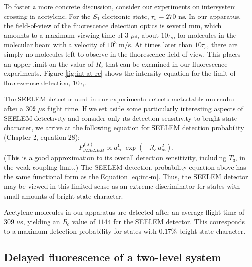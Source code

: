 \documentclass[12pt]{mitthesis}
\begin{document}
To foster a more concrete discussion, consider our experiments on
intersystem crossing in acetylene.  For the $S_1$ electronic state,
$\tau_s=270$ ns.  In our apparatus, the field-of-view of the
fluorescence detection optics is several mm, which amounts to a
maximum viewing time of 3 $\mu$s, about $10\tau_s$, for molecules in
the molecular beam with a velocity of $10^3$ m/s.  At times later than
$10\tau_s$, there are simply no molecules left to observe in the
fluorescence field of view.  This places an upper limit on the value
of $R_c$ that can be examined in our fluorescence experiments.  Figure
\ref{fig:int-at-rc} shows the intensity equation for the limit of
fluorescence detection, $10\tau_s$.

The SEELEM detector used in our experiments detects metastable
molecules after a 309 $\mu$s flight time.  If we set aside some
particularly interesting aspects of SEELEM detectivity and consider
only its detection sensitivity to bright state character, we arrive at
the following equation for SEELEM detection probability (Chapter 2,
equation 28):
\begin{equation}
  \label{eq:seelem-prob-s}
  P_{SEELEM}^{(s)} \propto a_m^4 \; \exp \left( -R_c \, a_m^2 \right).
\end{equation}
(This is a good approximation to its overall detection sensitivity,
including $T_3$, in the weak coupling limit.)  The SEELEM detection
probability equation above has the same functional form as the
Equation \ref{eq:int-m}.  Thus, the SEELEM detector may be viewed in
this limited sense as an extreme discriminator for states with small
amounts of bright state character.

Acetylene molecules in our apparatus are detected after an average
flight time of 309 $\mu$s, yielding an $R_c$ value of $1144$ for the
SEELEM detector.  This corresponds to a maximum detection probability
for states with $0.17\%$ bright state character.

\subsection{Delayed fluorescence of a two-level system}
\end{document}
